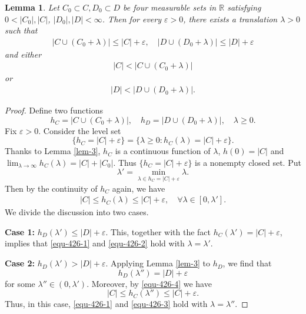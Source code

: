 \documentclass[12pt]{amsart}
\newtheorem{lemma}[proposition]{Lemma}
\theoremstyle{definition}
\numberwithin{equation}{section}
\begin{document}
\begin{lemma}\label{lem-4}
Let $C_0\subset C, D_0\subset D$ be four measurable sets in $\mathbb{R}$ satisfying $0<|C_0|, |C|$, $|D_0|, |D|<\infty$. Then for every $\varepsilon>0$, there  exists a translation $\lambda>0$ such that
\begin{align}\label{equ-426-1}
   |C\cup (C_0+\lambda)|\leq|C|+\varepsilon, \quad    |D\cup (D_0+\lambda)|\leq|D|+\varepsilon
\end{align}
and either
\begin{align}\label{equ-426-2}
  |C|<|C\cup (C_0+\lambda)|
\end{align}
or
\begin{align}\label{equ-426-3}
 |D|< |D\cup (D_0+\lambda)|.
\end{align}
\end{lemma}
\begin{proof}
Define two functions
$$
h_C=|C\cup (C_0+\lambda)|, \quad h_D=|D\cup (D_0+\lambda)|, \quad \lambda\geq 0.
$$
Fix $\varepsilon>0$. Consider the level set
$$
\{h_C=|C|+\varepsilon\}=\{\lambda\geq 0: h_C(\lambda)=|C|+\varepsilon\}.
$$
Thanks to Lemma \ref{lem-3}, $h_C$ is a continuous function of $\lambda$, $h(0)=|C|$ and $\lim_{\lambda\to \infty}\limits h_C(\lambda)=|C|+|C_0|$. Thus $\{h_C=|C|+\varepsilon\}$ is a nonempty closed set. Put
$$
\lambda'=\min_{\lambda\in h_C=|C|+\varepsilon} \lambda.
$$
Then by the continuity of $h_C$ again, we have
\begin{align}\label{equ-426-4}
|C|\leq h_C(\lambda)\leq|C|+\varepsilon, \quad \forall \lambda\in[0,\lambda'].
\end{align}
We divide the discussion into two cases.

{\bf Case 1:} $h_D(\lambda')\leq |D|+\varepsilon$. This, together with the fact $h_C(\lambda')=|C|+\varepsilon$, implies that \eqref{equ-426-1} and \eqref{equ-426-2} hold with $\lambda=\lambda'$.

{\bf Case 2:} $h_D(\lambda')>|D|+\varepsilon$. Applying Lemma \ref{lem-3} to $h_D$, we find that
$$
 h_D(\lambda'')=|D|+\varepsilon
$$
for some $\lambda''\in(0,\lambda')$. Moreover, by \eqref{equ-426-4} we have
$$
|C|\leq h_C(\lambda'')\leq|C|+\varepsilon.
$$
Thus, in this case, \eqref{equ-426-1} and \eqref{equ-426-3} hold with $\lambda=\lambda''$.
\end{proof}
\end{document}

